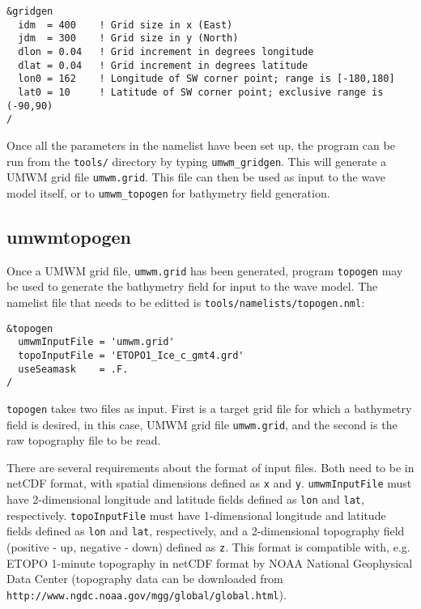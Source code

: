 \documentclass[letterpaper]{article}
\numberwithin{equation}{section}
\begin{document}
\begin{verbatim}
&gridgen
  idm  = 400    ! Grid size in x (East)
  jdm  = 300    ! Grid size in y (North)
  dlon = 0.04   ! Grid increment in degrees longitude
  dlat = 0.04   ! Grid increment in degrees latitude
  lon0 = 162    ! Longitude of SW corner point; range is [-180,180]
  lat0 = 10     ! Latitude of SW corner point; exclusive range is (-90,90)
/
\end{verbatim}

Once all the parameters in the namelist have been set up, the 
program can be run from the \verb+tools/+ directory by typing \verb+umwm_gridgen+.
This will generate a UMWM grid file \verb+umwm.grid+.
This file can then be used as input to the wave model itself,
or to \verb+umwm_topogen+ for bathymetry field generation.

\subsection{umwm\textunderscore topogen}
\label{sec:topogen}

Once a UMWM grid file, \verb+umwm.grid+ has been generated,
program \verb+topogen+ may be used to generate the bathymetry 
field for input to the wave model.
The namelist file that needs to be editted is \verb+tools/namelists/topogen.nml+:

\begin{verbatim}
&topogen
  umwmInputFile = 'umwm.grid'
  topoInputFile = 'ETOPO1_Ice_c_gmt4.grd'
  useSeamask    = .F.
/
\end{verbatim}

\verb+topogen+ takes two files as input.
First is a target grid file for which a bathymetry field is desired,
in this case, UMWM grid file \verb+umwm.grid+, and the second
is the raw topography file to be read.

There are several requirements about the format of input files.
Both need to be in netCDF format, with spatial dimensions 
defined as \verb+x+ and \verb+y+.
\verb+umwmInputFile+ must have 2-dimensional longitude and latitude 
fields defined as \verb+lon+ and \verb+lat+, respectively.
\verb+topoInputFile+ must have 1-dimensional longitude and latitude
fields defined as \verb+lon+ and \verb+lat+, respectively,
and a 2-dimensional topography field (positive - up, negative - down)
defined as \verb+z+.
This format is compatible with, e.g. ETOPO 1-minute topography in netCDF
format by NOAA National Geophysical Data Center 
(topography data can be downloaded from \verb+http://www.ngdc.noaa.gov/mgg/global/global.html+).
\end{document}
